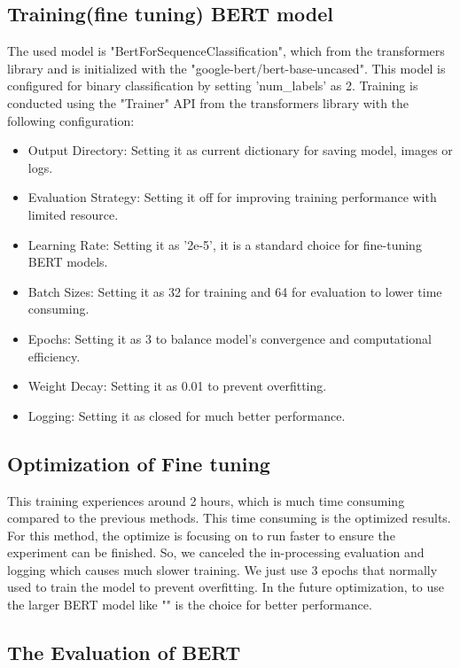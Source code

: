 \subsection{Training(fine tuning) BERT model}
The used model is "BertForSequenceClassification", which from the transformers library and is initialized with the "google-bert/bert-base-uncased". This model is configured for binary classification by setting 'num\_labels' as 2. Training is conducted using the "Trainer" API from the transformers library with the following configuration:

\begin{itemize}
    \item Output Directory: Setting it as current dictionary for saving model, images or logs.
    \item Evaluation Strategy: Setting it off for improving training performance with limited resource.
    \item Learning Rate: Setting it as '2e-5', it is a standard choice for fine-tuning BERT models.
    \item Batch Sizes: Setting it as 32 for training and 64 for evaluation to lower time consuming.
    \item Epochs: Setting it as 3 to balance model's convergence and computational efficiency.
    \item Weight Decay: Setting it as 0.01 to prevent overfitting.
    \item Logging: Setting it as closed for much better performance.
\end{itemize}

\subsection{Optimization of Fine tuning}
This training experiences around 2 hours, which is much time consuming compared to the previous methods. This time consuming is the optimized results. For this method, the optimize is focusing on to run faster to ensure the experiment can be finished. So, we canceled the in-processing evaluation and logging which causes much slower training. We just use 3 epochs that normally used to train the model to prevent overfitting. In the future optimization, to use the larger BERT model like "" is the choice for better performance. 

\subsection{The Evaluation of BERT}


